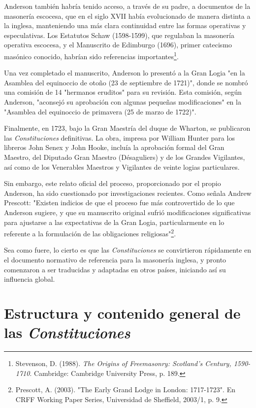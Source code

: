 \documentclass[a4paper,12pt,twoside]{book}
\begin{document}
Anderson también habría tenido acceso, a través de su padre, a documentos de la masonería escocesa, que en el siglo XVII había evolucionado de manera distinta a la inglesa, manteniendo una más clara continuidad entre las formas operativas y especulativas. Los Estatutos Schaw (1598-1599), que regulaban la masonería operativa escocesa, y el Manuscrito de Edimburgo (1696), primer catecismo masónico conocido, habrían sido referencias importantes\footnote{Stevenson, D. (1988). \textit{The Origins of Freemasonry: Scotland's Century, 1590-1710}. Cambridge: Cambridge University Press, p. 189.}.

Una vez completado el manuscrito, Anderson lo presentó a la Gran Logia "en la Asamblea del equinoccio de otoño (23 de septiembre de 1721)", donde se nombró una comisión de 14 "hermanos eruditos" para su revisión. Esta comisión, según Anderson, "aconsejó su aprobación con algunas pequeñas modificaciones" en la "Asamblea del equinoccio de primavera (25 de marzo de 1722)".

Finalmente, en 1723, bajo la Gran Maestría del duque de Wharton, se publicaron las \textit{Constituciones} definitivas. La obra, impresa por William Hunter para los libreros John Senex y John Hooke, incluía la aprobación formal del Gran Maestro, del Diputado Gran Maestro (Désaguliers) y de los Grandes Vigilantes, así como de los Venerables Maestros y Vigilantes de veinte logias particulares.

Sin embargo, este relato oficial del proceso, proporcionado por el propio Anderson, ha sido cuestionado por investigaciones recientes. Como señala Andrew Prescott: "Existen indicios de que el proceso fue más controvertido de lo que Anderson sugiere, y que su manuscrito original sufrió modificaciones significativas para ajustarse a las expectativas de la Gran Logia, particularmente en lo referente a la formulación de las obligaciones religiosas"\footnote{Prescott, A. (2003). "The Early Grand Lodge in London: 1717-1723". En CRFF Working Paper Series, Universidad de Sheffield, 2003/1, p. 9.}.

Sea como fuere, lo cierto es que las \textit{Constituciones} se convirtieron rápidamente en el documento normativo de referencia para la masonería inglesa, y pronto comenzaron a ser traducidas y adaptadas en otros países, iniciando así su influencia global.

\section{Estructura y contenido general de las \textit{Constituciones}}
\end{document}
